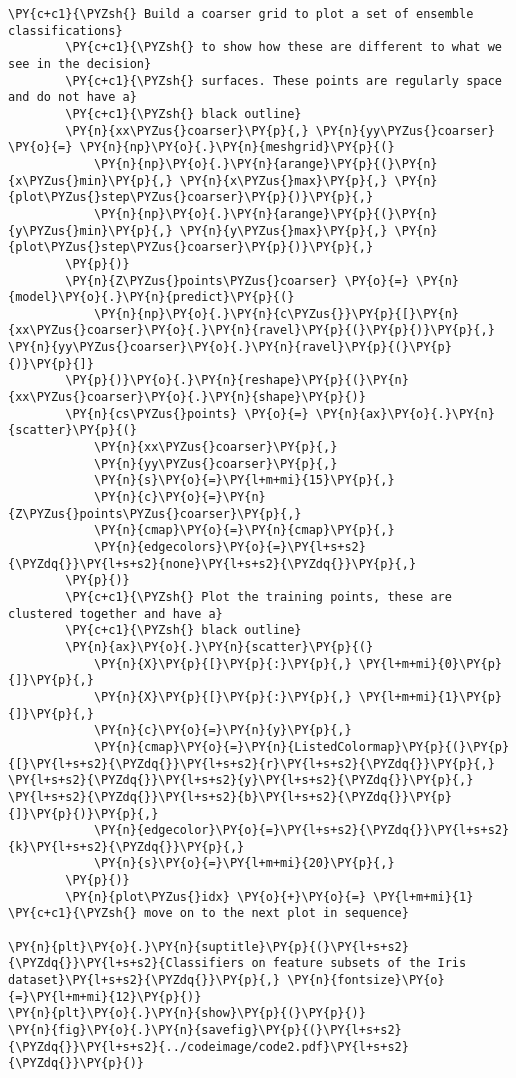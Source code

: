 \begin{Verbatim}[commandchars=\\\{\}]
        \PY{c+c1}{\PYZsh{} Build a coarser grid to plot a set of ensemble classifications}
        \PY{c+c1}{\PYZsh{} to show how these are different to what we see in the decision}
        \PY{c+c1}{\PYZsh{} surfaces. These points are regularly space and do not have a}
        \PY{c+c1}{\PYZsh{} black outline}
        \PY{n}{xx\PYZus{}coarser}\PY{p}{,} \PY{n}{yy\PYZus{}coarser} \PY{o}{=} \PY{n}{np}\PY{o}{.}\PY{n}{meshgrid}\PY{p}{(}
            \PY{n}{np}\PY{o}{.}\PY{n}{arange}\PY{p}{(}\PY{n}{x\PYZus{}min}\PY{p}{,} \PY{n}{x\PYZus{}max}\PY{p}{,} \PY{n}{plot\PYZus{}step\PYZus{}coarser}\PY{p}{)}\PY{p}{,}
            \PY{n}{np}\PY{o}{.}\PY{n}{arange}\PY{p}{(}\PY{n}{y\PYZus{}min}\PY{p}{,} \PY{n}{y\PYZus{}max}\PY{p}{,} \PY{n}{plot\PYZus{}step\PYZus{}coarser}\PY{p}{)}\PY{p}{,}
        \PY{p}{)}
        \PY{n}{Z\PYZus{}points\PYZus{}coarser} \PY{o}{=} \PY{n}{model}\PY{o}{.}\PY{n}{predict}\PY{p}{(}
            \PY{n}{np}\PY{o}{.}\PY{n}{c\PYZus{}}\PY{p}{[}\PY{n}{xx\PYZus{}coarser}\PY{o}{.}\PY{n}{ravel}\PY{p}{(}\PY{p}{)}\PY{p}{,} \PY{n}{yy\PYZus{}coarser}\PY{o}{.}\PY{n}{ravel}\PY{p}{(}\PY{p}{)}\PY{p}{]}
        \PY{p}{)}\PY{o}{.}\PY{n}{reshape}\PY{p}{(}\PY{n}{xx\PYZus{}coarser}\PY{o}{.}\PY{n}{shape}\PY{p}{)}
        \PY{n}{cs\PYZus{}points} \PY{o}{=} \PY{n}{ax}\PY{o}{.}\PY{n}{scatter}\PY{p}{(}
            \PY{n}{xx\PYZus{}coarser}\PY{p}{,}
            \PY{n}{yy\PYZus{}coarser}\PY{p}{,}
            \PY{n}{s}\PY{o}{=}\PY{l+m+mi}{15}\PY{p}{,}
            \PY{n}{c}\PY{o}{=}\PY{n}{Z\PYZus{}points\PYZus{}coarser}\PY{p}{,}
            \PY{n}{cmap}\PY{o}{=}\PY{n}{cmap}\PY{p}{,}
            \PY{n}{edgecolors}\PY{o}{=}\PY{l+s+s2}{\PYZdq{}}\PY{l+s+s2}{none}\PY{l+s+s2}{\PYZdq{}}\PY{p}{,}
        \PY{p}{)}
        \PY{c+c1}{\PYZsh{} Plot the training points, these are clustered together and have a}
        \PY{c+c1}{\PYZsh{} black outline}
        \PY{n}{ax}\PY{o}{.}\PY{n}{scatter}\PY{p}{(}
            \PY{n}{X}\PY{p}{[}\PY{p}{:}\PY{p}{,} \PY{l+m+mi}{0}\PY{p}{]}\PY{p}{,}
            \PY{n}{X}\PY{p}{[}\PY{p}{:}\PY{p}{,} \PY{l+m+mi}{1}\PY{p}{]}\PY{p}{,}
            \PY{n}{c}\PY{o}{=}\PY{n}{y}\PY{p}{,}
            \PY{n}{cmap}\PY{o}{=}\PY{n}{ListedColormap}\PY{p}{(}\PY{p}{[}\PY{l+s+s2}{\PYZdq{}}\PY{l+s+s2}{r}\PY{l+s+s2}{\PYZdq{}}\PY{p}{,} \PY{l+s+s2}{\PYZdq{}}\PY{l+s+s2}{y}\PY{l+s+s2}{\PYZdq{}}\PY{p}{,} \PY{l+s+s2}{\PYZdq{}}\PY{l+s+s2}{b}\PY{l+s+s2}{\PYZdq{}}\PY{p}{]}\PY{p}{)}\PY{p}{,}
            \PY{n}{edgecolor}\PY{o}{=}\PY{l+s+s2}{\PYZdq{}}\PY{l+s+s2}{k}\PY{l+s+s2}{\PYZdq{}}\PY{p}{,}
            \PY{n}{s}\PY{o}{=}\PY{l+m+mi}{20}\PY{p}{,}
        \PY{p}{)}
        \PY{n}{plot\PYZus{}idx} \PY{o}{+}\PY{o}{=} \PY{l+m+mi}{1}  \PY{c+c1}{\PYZsh{} move on to the next plot in sequence}

\PY{n}{plt}\PY{o}{.}\PY{n}{suptitle}\PY{p}{(}\PY{l+s+s2}{\PYZdq{}}\PY{l+s+s2}{Classifiers on feature subsets of the Iris dataset}\PY{l+s+s2}{\PYZdq{}}\PY{p}{,} \PY{n}{fontsize}\PY{o}{=}\PY{l+m+mi}{12}\PY{p}{)}
\PY{n}{plt}\PY{o}{.}\PY{n}{show}\PY{p}{(}\PY{p}{)}
\PY{n}{fig}\PY{o}{.}\PY{n}{savefig}\PY{p}{(}\PY{l+s+s2}{\PYZdq{}}\PY{l+s+s2}{../codeimage/code2.pdf}\PY{l+s+s2}{\PYZdq{}}\PY{p}{)}
\end{Verbatim}

